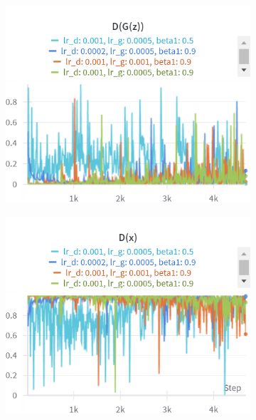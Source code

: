 \begin{figure}[H]
    \begin{subfigure}{0.45\textwidth}
        \centering
        \includegraphics[width=0.95\linewidth]{lr/D_G_z.png}
        \caption{}
        \label{subfig:lr/D_G_z}
    \end{subfigure}%
    \begin{subfigure}{0.45\textwidth}
        \centering
        \includegraphics[width=0.95\linewidth]{lr/D_x.png}
        \caption{}
        \label{subfig:lr/D_x}
    \end{subfigure}


\end{figure}
